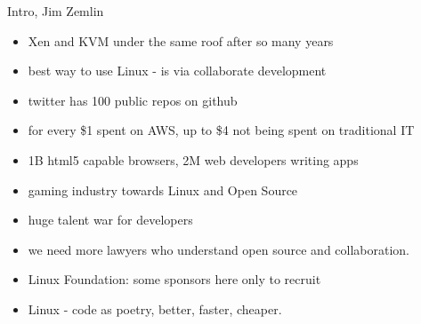 \documentclass[aspectratio=169]{beamer}
\begin{document}
{
\begin{frame}[plain]{}
\end{frame}
}

\begin{frame}{Intro, Jim Zemlin}
  \begin{itemize}
  \item Xen and KVM under the same roof after so many years
  \item best way to use Linux - is via collaborate development
  \item twitter has 100 public repos on github
  \item for every \$1 spent on AWS, up to \$4 not being spent on traditional IT
  \item 1B html5 capable browsers, 2M web developers writing apps
  \item gaming industry towards Linux and Open Source
  \item huge talent war for developers
  \item we need more lawyers who understand open source and collaboration.
  \item Linux Foundation: some sponsors here only to recruit
  \item Linux - code as poetry, better, faster, cheaper.
  \end{itemize}
\end{frame}
\end{document}
